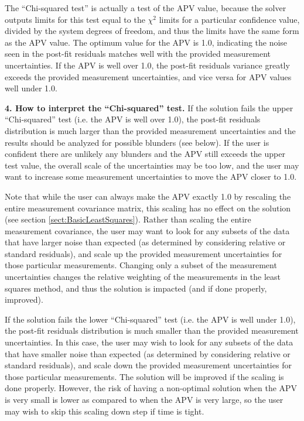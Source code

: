 The ``Chi-squared test'' is actually a test of the APV value, because the solver outputs limits for this test equal to the $\chi^2$ limits for a particular confidence value, divided by the system degrees of freedom, and thus the limits have the same form as the APV value. The optimum value for the APV is 1.0, indicating the noise seen in the post-fit residuals matches well with the provided measurement uncertainties. If the APV is well over 1.0, the post-fit residuals variance greatly exceeds the provided measurement uncertainties, and vice versa for APV values well under 1.0. 

\textbf{4. How to interpret the ``Chi-squared'' test.} If the solution fails the upper ``Chi-squared'' test (i.e. the APV is well over 1.0), the post-fit residuals distribution is much larger than the provided measurement uncertainties and the results should be analyzed for possible blunders (see below). If the user is confident there are unlikely any blunders and the APV still exceeds the upper test value, the overall scale of the uncertainties may be too low, and the user may want to increase some measurement uncertainties to move the APV closer to 1.0.

Note that while the user can always make the APV exactly 1.0 by rescaling the entire measurement covariance matrix, this scaling has no effect on the solution (see section \ref{sect:BasicLeastSquares}). Rather than scaling the entire measurement covariance, the user may want to look for any subsets of the data that have larger noise than expected (as determined by considering relative or standard residuals), and scale up the provided measurement uncertainties for those particular measurements. Changing only a subset of the measurement uncertainties changes the relative weighting of the measurements in the least squares method, and thus the solution is impacted (and if done properly, improved).

If the solution fails the lower ``Chi-squared'' test (i.e. the APV is well under 1.0), the post-fit residuals distribution is much smaller than the provided measurement uncertainties. In this case, the user may wish to look for any subsets of the data that have smaller noise than expected (as determined by considering relative or standard residuals), and scale down the provided measurement uncertainties for those particular measurements. The solution will be improved if the scaling is done properly. However, the risk of having a non-optimal solution when the APV is very small is lower as compared to when the APV is very large, so the user may wish to skip this scaling down step if time is tight. 

